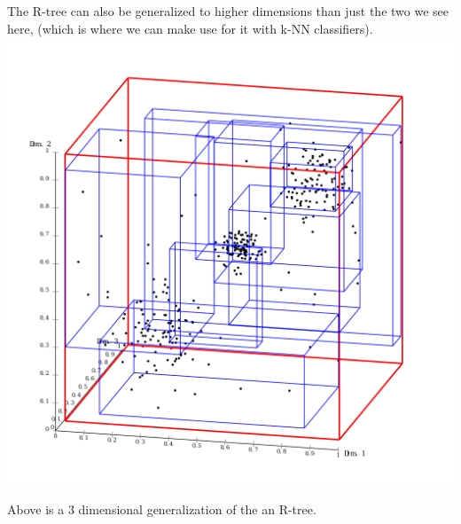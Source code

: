 \documentclass[english, 10pt]{article}
\begin{document}
\begin{tcolorbox}[title=Aside: R-tree,colframe=black,colback=white,arc=0pt,fonttitle=\bfseries,breakable]
The R-tree can also be generalized to higher dimensions than just the two we see here, (which is where we can make use for it with k-NN classifiers).\\

\includegraphics[scale=0.4]{img/rstartree.png}

\hfill \break Above is a 3 dimensional generalization of the an R-tree. 

\end{tcolorbox}
\end{document}
